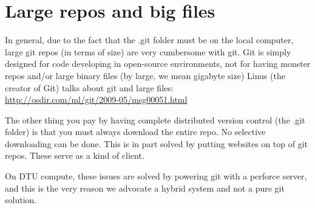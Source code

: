 \documentclass[10pt,a4paper]{article}
\begin{document}
\section{Large repos and big files}
In general, due to the fact that the .git folder must be on the local computer, large git repos (in terms of size) are very cumbersome with git. Git is simply designed for code developing in open-source environments, not for having monster repos and/or large binary files (by large, we mean gigabyte size)
Linus (the creator of Git) talks about git and large files:\\
\url{http://osdir.com/ml/git/2009-05/msg00051.html}

The other thing you pay by having complete distributed version control (the .git folder) is that you must always download the entire repo. No selective downloading can be done. This is in part solved by putting websites on top of git repos. These serve as a kind of client.

On DTU compute, these issues are solved by powering git with a perforce server, and this is the very reason we advocate a hybrid system and not a pure git solution.
\end{document}
